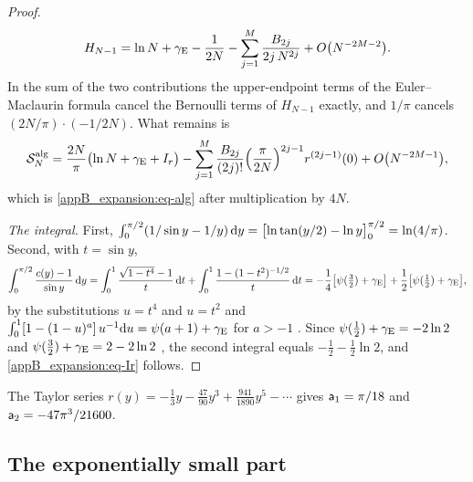 \begin{proof}
\begin{equation*}
  H_{N-1}=\ln N+\gamma_{\mathrm{E}}-\frac1{2N}-\sum_{j=1}^{M}\frac{B_{2j}}{2j\,N^{2j}}+O\bigl(N^{-2M-2}\bigr).
\end{equation*}
In the sum of the two contributions the upper-endpoint terms of the Euler--Maclaurin formula cancel the Bernoulli
terms of $H_{N-1}$ exactly, and $1/\pi$ cancels $(2N/\pi)\cdot(-1/2N)$. What remains is
\begin{equation*}
  \mathcal S^{\mathrm{alg}}_N=\frac{2N}{\pi}\bigl(\ln N+\gamma_{\mathrm{E}}+I_r\bigr)
  -\sum_{j=1}^{M}\frac{B_{2j}}{(2j)!}\Bigl(\frac{\pi}{2N}\Bigr)^{2j-1}r^{(2j-1)}(0)+O\bigl(N^{-2M-1}\bigr),
\end{equation*}
which is \eqref{appB_expansion:eq-alg} after multiplication by $4N$.

\emph{The integral.} First, $\int_{0}^{\pi/2}(1/\sin y-1/y)\,\mathrm{d} y=\bigl[\ln\tan(y/2)-\ln y\bigr]_{0}^{\pi/2}=\ln(4/\pi)$.
Second, with $t=\sin y$,
\begin{equation*}
  \int_{0}^{\pi/2}\frac{c(y)-1}{\sin y}\,\mathrm{d} y
  =\int_{0}^{1}\frac{\sqrt{1-t^{4}}-1}{t}\,\mathrm{d} t+\int_{0}^{1}\frac{1-(1-t^{2})^{-1/2}}{t}\,\mathrm{d} t
  =-\frac14\bigl[\psi(\tfrac32)+\gamma_{\mathrm{E}}\bigr]+\frac12\bigl[\psi(\tfrac12)+\gamma_{\mathrm{E}}\bigr],
\end{equation*}
by the substitutions $u=t^{4}$ and $u=t^{2}$ and $\int_{0}^{1}[1-(1-u)^{a}]\,u^{-1}\mathrm{d} u=\psi(a+1)+\gamma_{\mathrm{E}}$ for
$a>-1$ \citep[Eq.~5.9.16]{DLMF}. Since $\psi(\tfrac12)+\gamma_{\mathrm{E}}=-2\ln2$ and $\psi(\tfrac32)+\gamma_{\mathrm{E}}=2-2\ln2$
\citep[Eqs.~5.4.13, 5.4.15]{DLMF}, the second integral equals $-\tfrac12-\tfrac12\ln2$, and
\eqref{appB_expansion:eq-Ir} follows.
\end{proof}

The Taylor series $r(y)=-\tfrac13y-\tfrac{47}{90}y^{3}+\tfrac{941}{1890}y^{5}-\cdots$ gives $\mathsf{a}_1=\pi/18$ and
$\mathsf{a}_2=-47\pi^{3}/21600$. %

\subsection{The exponentially small part}

